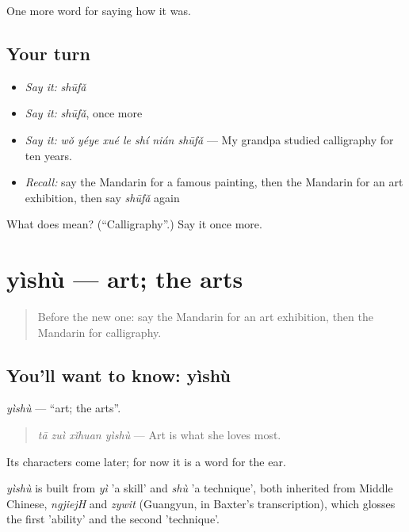 \begin{grammarlens}[title={What you've built}]
One more word for saying how it was.
\end{grammarlens}

\subsection*{Your turn}
\begin{itemize}
\raggedright
  \item \emph{Say it:} \emph{shūfǎ}
  \item \emph{Say it:} \emph{shūfǎ}, once more
  \item \emph{Say it:} \emph{wǒ yéye xué le shí nián shūfǎ} — My grandpa studied calligraphy for ten years.
  \item \emph{Recall:} say the Mandarin for a famous painting, then the Mandarin for an art exhibition, then say \emph{shūfǎ} again
\end{itemize}

\begin{tcolorbox}[breakable,colback=teal!4,colframe=teal!35!black,title={Before you move on}]
What does  mean? (\textquotedblleft{}Calligraphy\textquotedblright{}.) Say it once more.
\end{tcolorbox}
\section[yìshù]{yìshù — art; the arts}

\label{lesson:ZH-C503-yishu}



\begin{quote}
Before the new one: say the Mandarin for an art exhibition, then the Mandarin for calligraphy.
\end{quote}

\subsection*{You'll want to know: yìshù}
\emph{yìshù} — \textquotedblleft{}art; the arts\textquotedblright{}.

\begin{quote}
\emph{tā zuì xǐhuan yìshù} — Art is what she loves most.
\end{quote}

Its characters come later; for now it is a word for the ear.

\begin{cousinweb}
\emph{yìshù} is built from \emph{yì} 'a skill' and \emph{shù} 'a technique', both inherited from Middle Chinese, \emph{ngjiejH} and \emph{zywit} (Guangyun, in Baxter's transcription), which glosses the first 'ability' and the second 'technique'.
\end{cousinweb}

